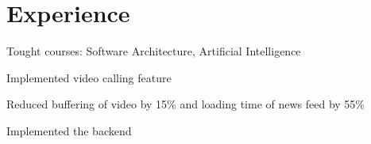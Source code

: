 \documentclass[letterpaper]{deedy-resume} %
\begin{document}
\hfill
%
%
\begin{minipage}[t]{0.66\textwidth} %


\section{Experience}


\vspace{\topsep} %
\begin{tightitemize}
\item Tought courses: Software Architecture, Artificial Intelligence
\end{tightitemize}

\sectionspace %



\begin{tightitemize}
\item Implemented video calling feature
\item Reduced buffering of video by 15\% and loading time of news feed by 55\%
\end{tightitemize}

\sectionspace %



\begin{tightitemize}
\item Implemented the backend
\end{tightitemize}




\end{minipage}
\end{document}
